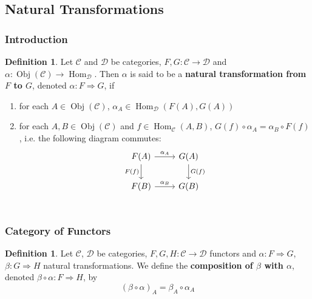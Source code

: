 \documentclass[12pt]{amsart}
\theoremstyle{definition}
\newtheorem{defn}[definition]{Definition}
\newcommand{\al}{\alpha}
\newcommand{\be}{\beta}
\newcommand{\MC}{\mathcal{C}}
\newcommand{\MD}{\mathcal{D}}
\DeclareMathOperator{\Obj}{Obj}
\DeclareMathOperator{\Hom}{Hom}
\DeclareMathOperator*{\0}{\mbf{0}}
\DeclareMathOperator*{\1}{\mbf{1}}
\newcommand{\ld}[1]{\label{defn:#1}}
\begin{document}
	
	
	
	
	
	
	
	
	
	
	
	
	\newpage
	\subsection{Natural Transformations}
	
	\subsubsection{Introduction}
	
	\begin{defn} \ld{14001}
		Let $\MC$ and $\MD$ be categories, $F, G: \MC \rightarrow \MD$ and $ \al : \Obj(\MC) \rightarrow  \Hom_{\MD}$. Then $\al$ is said to be a \textbf{natural transformation from $F$ to $G$}, denoted $\al: F \Rightarrow G$, if
		\begin{enumerate}
			\item for each $A \in \Obj(\MC)$, $\al_A \in \Hom_{\MD}(F(A), G(A))$
			\item for each $A, B \in \Obj(\MC)$ and $f \in \Hom_{\MC}(A,B)$, $G(f) \circ \al_A = \al_B \circ F(f)$, i.e. the following diagram commutes: 
			\[ 
			\begin{tikzcd}
				F(A)  \arrow[r, "\al_A"]  \arrow[d, "F(f)"']  & G(A)   \arrow[d, "G(f)"]\\
				F(B) \arrow[r, "\al_B"] &  G(B) \\
			\end{tikzcd}
			\]
		\end{enumerate}
	\end{defn}






	
	
	
	
	
	
	
	
	
	
	\subsubsection{Category of Functors}
	\begin{defn} \ld{14002}
		Let $\MC$, $\MD$ be categories, $F, G, H:\MC \rightarrow \MD$ functors and $\al: F \Rightarrow G$, $\be : G \Rightarrow H$ natural transformations. We define the \textbf{composition of $\be$ with $\al$}, denoted $\be \circ \al: F \Rightarrow H$, by 
		$$(\be \circ \al)_{A} = \be_A \circ \al_A$$ 
	\end{defn}
	
\end{document}
